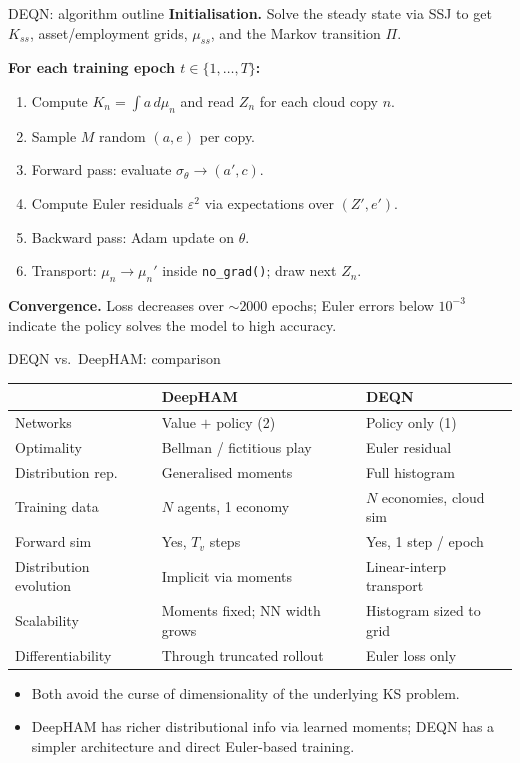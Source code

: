\documentclass[10pt,english,aspectratio=169]{beamer}
\begin{document}
\begin{frame}{DEQN: algorithm outline}
\textbf{Initialisation.} Solve the steady state via SSJ to get $K_{ss}$, asset/employment grids, $\mu_{ss}$, and the Markov transition $\Pi$.
\medskip

\textbf{For each training epoch $t \in \{1,\ldots,T\}$:}
\begin{enumerate}
\item Compute $K_n = \int a\,d\mu_n$ and read $Z_n$ for each cloud copy $n$.
\item Sample $M$ random $(a, e)$ per copy.
\item Forward pass: evaluate $\sigma_\theta \to (a', c)$.
\item Compute Euler residuals $\varepsilon^2$ via expectations over $(Z', e')$.
\item Backward pass: Adam update on $\theta$.
\item Transport: $\mu_n \to \mu_n'$ inside \texttt{no\_grad()}; draw next $Z_n$.
\end{enumerate}
\medskip

\textbf{Convergence.} Loss decreases over $\sim 2000$ epochs; Euler errors below $10^{-3}$ indicate the policy solves the model to high accuracy.
\end{frame}

\begin{frame}{DEQN vs.\ DeepHAM: comparison}
\begin{center}
\small
\begin{tabular}{lll}
\toprule
 & \textbf{DeepHAM} & \textbf{DEQN}\\
\midrule
Networks & Value $+$ policy (2) & Policy only (1)\\
Optimality & Bellman / fictitious play & Euler residual\\
Distribution rep.\ & Generalised moments & Full histogram\\
Training data & $N$ agents, 1 economy & $N$ economies, cloud sim\\
Forward sim & Yes, $T_v$ steps & Yes, 1 step / epoch\\
Distribution evolution & Implicit via moments & Linear-interp transport\\
Scalability & Moments fixed; NN width grows & Histogram sized to grid\\
Differentiability & Through truncated rollout & Euler loss only\\
\bottomrule
\end{tabular}
\end{center}
\medskip
\begin{itemize}
\item Both avoid the curse of dimensionality of the underlying KS problem.
\item DeepHAM has richer distributional info via learned moments; DEQN has a simpler architecture and direct Euler-based training.
\end{itemize}
\end{frame}
\end{document}
